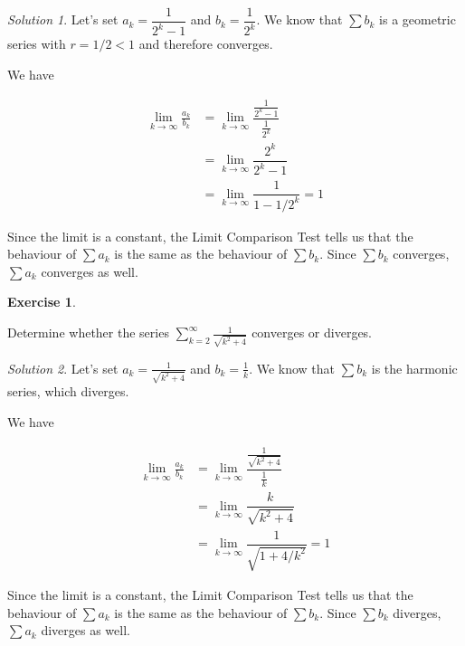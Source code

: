 \documentclass[
]{book}
\theoremstyle{definition}
\theoremstyle{definition}
\theoremstyle{definition}
\newtheorem{exercise}{Exercise}[chapter]
\theoremstyle{definition}
\theoremstyle{remark}
\newtheorem*{solution}{Solution}
\begin{document}
\begin{solution}

Let's set \(a_k=\dfrac{1}{2^k-1}\) and \(b_k=\dfrac{1}{2^k}\). We know that \(\displaystyle \sum b_k\) is a geometric series with \(r=1/2<1\) and therefore converges.

We have

\begin{align*}
\lim_{k\to\infty}\frac{a_k}{b_k}&= \lim_{k\to\infty} \dfrac{\frac{1}{2^k-1}}{\frac{1}{2^k}}\\
&= \lim_{k\to\infty}\dfrac{2^k}{2^k-1}\\
&= \lim_{k\to\infty}\dfrac{1}{1-1/2^k} =1
\end{align*}

Since the limit is a constant, the Limit Comparison Test tells us that the behaviour of \(\displaystyle \sum a_k\) is the same as the behaviour of \(\displaystyle \sum b_k\). Since \(\displaystyle \sum b_k\) converges, \(\displaystyle \sum a_k\) converges as well.

\end{solution}

\begin{exercise}
\protect\hypertarget{exr:unlabeled-div-207}{}\label{exr:unlabeled-div-207}

Determine whether the series \(\displaystyle \sum_{k=2}^\infty \frac{1}{\sqrt{k^2+4}}\) converges or diverges.

\end{exercise}

\begin{solution}

Let's set \(a_k=\frac{1}{\sqrt{k^2+4}}\) and \(b_k=\frac{1}{k}\). We know that \(\displaystyle \sum b_k\) is the harmonic series, which diverges.

We have

\begin{align*}
\lim_{k\to\infty}\frac{a_k}{b_k}&= \lim_{k\to\infty} \dfrac{\frac{1}{\sqrt{k^2+4}}}{\frac{1}{k}}\\
&= \lim_{k\to\infty}\dfrac{k}{\sqrt{k^2+4}}\\
&= \lim_{k\to\infty}\dfrac{1}{\sqrt{1+4/k^2}} =1
\end{align*}

Since the limit is a constant, the Limit Comparison Test tells us that the behaviour of \(\displaystyle \sum a_k\) is the same as the behaviour of \(\displaystyle \sum b_k\). Since \(\displaystyle \sum b_k\) diverges, \(\displaystyle \sum a_k\) diverges as well.

\end{solution}
\end{document}
